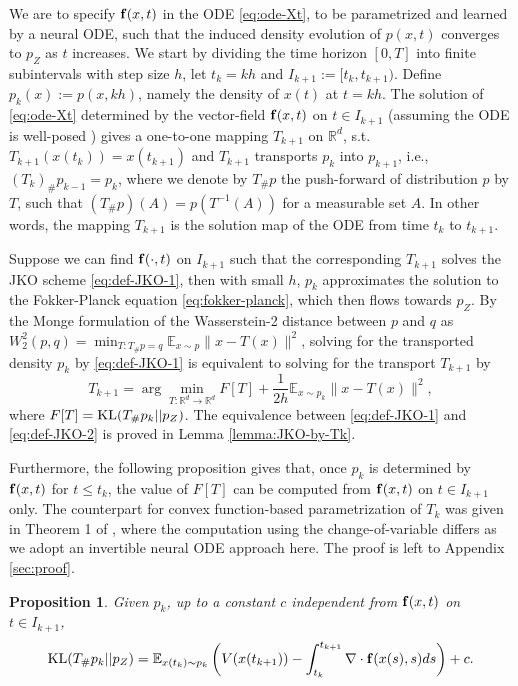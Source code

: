 \documentclass{article}
\newtheorem{proposition}[theorem]{Proposition}
\theoremstyle{remark}
\theoremstyle{plain}
\newcommand{\R}{\mathbb{R}}
\newcommand{\E}{\mathbb{E}}
\begin{document}
We are to specify ${\bf f}(x ,t)$ in the ODE \eqref{eq:ode-Xt}, to be parametrized and learned by a neural ODE,
such that the induced density evolution of $p(x,t)$ converges to  $p_Z $ as $t$ increases. 
We start by dividing the time horizon $[0,T]$ into finite subintervals with step size $h$, 
let  $t_k = kh$ and $I_{k+1} := [t_{k}, t_{k+1})$.
Define $p_k(x) := p(x, k h)$, namely the density of $x(t)$ at $t= kh$.
The solution of  \eqref{eq:ode-Xt} determined by the vector-field ${\bf f}(x ,t)$ on $t \in I_{k+1}$ 
(assuming the ODE is well-posed {\citep{Sideris2013OrdinaryDE}})
gives a one-to-one mapping $T_{k+1}$ on $\R^d$,
s.t. $T_{k+1}( x( t_{k}) ) = x( t_{k+1})$ and  $T_{k+1}$ transports $p_{k}$ into $p_{k+1}$,
i.e., $(T_k)_\# p_{k-1} = p_{k}$,
where we denote by $T_\# p $ the push-forward of distribution $p$ by $T$, such that $(T_\# p)( A ) = p( T^{-1} (A))$ for a measurable set $A$.
In other words, the mapping $T_{k+1}$ is the solution map of the ODE from time $t_k$ to $t_{k+1}$.

Suppose we can find ${\bf f}( \cdot ,t)$ on $I_{k+1}$ such that the corresponding $T_{k+1}$ solves 
the JKO scheme \eqref{eq:def-JKO-1}, 
then with small $h$, $p_k$ approximates the solution to the Fokker-Planck equation \ref{eq:fokker-planck},
 which then flows towards $p_Z$. 
By the Monge formulation of the Wasserstein-2 distance between $p$ and $q$ as
$W_{2}^{2}(p, q)=\min_{T:T_{\#} p = q} \E_{x \sim p} \| x-T(x) \|^{2} $,
solving for the transported density $p_{k}$ by \eqref{eq:def-JKO-1} is equivalent to solving for the transport $T_{k+1}$ by
\begin{equation}\label{eq:def-JKO-2}
T_{k+1} = \arg \min_{T: \R^d \to \R^d}
F[T ]+ \frac{1}{2h} \E_{x \sim p_{k}} \| x-T(x) \|^{2},
%
\end{equation}
where $F[T] = {\rm KL}(  T_\# p_{k} || p_Z)$.
The equivalence between \eqref{eq:def-JKO-1} and \eqref{eq:def-JKO-2} is proved in Lemma \ref{lemma:JKO-by-Tk}. 

%
Furthermore, the following proposition gives that, once $p_{k}$ is determined by  ${\bf f}(x ,t)$ for $t  \le t_{k}$, 
the value of $F[T]$ can be computed from ${\bf f}(x ,t)$ on $t \in I_{k+1}$ only. 
The counterpart for convex function-based parametrization of $T_k$ was given in Theorem 1 of \citep{mokrov2021large},
where the computation using the change-of-variable differs as we adopt an invertible neural ODE approach here.
The proof is left to Appendix \ref{sec:proof}.

%
\begin{proposition}\label{prop:FT-layer-wise}
Given $p_{k}$, up to a constant  $c$ independent from  ${\bf f}(x ,t)$ on $t \in I_{k+1}$,
\begin{equation}\label{eq:FT-layer-wise}
{\rm KL}(  T_\# p_{k} || p_Z)
=  \E_{x(t_{k}) \sim p_{k}}  
  	\left(  V( x( t_{k+1}))  -  \int_{ t_k }^{t_{k+1} }\nabla\cdot\mathbf{f}( x (s),s)ds  \right) + c.
\end{equation}
\end{proposition}
\end{document}
